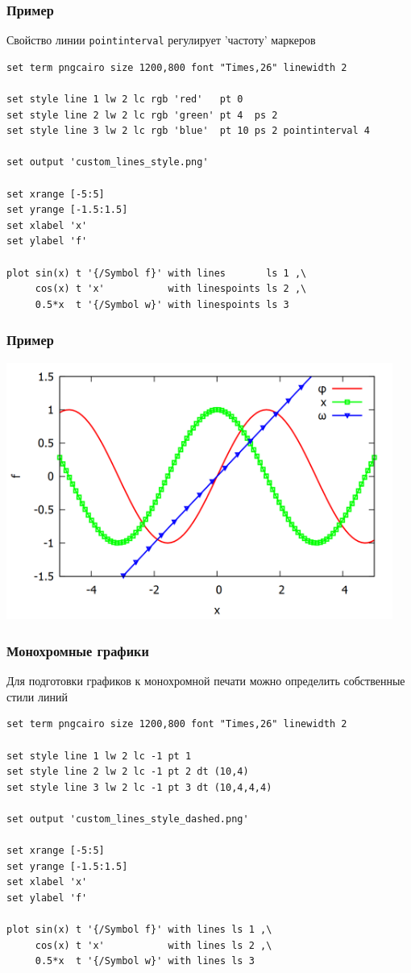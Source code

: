 \documentclass[12pt, compress]{beamer}
\newcommand{\code}[1]{\textcolor{dark-green}{\texttt{#1}}}
\begin{document}
\begin{frame}[t,fragile]
\frametitle{Пример}
Свойство линии \code{pointinterval} регулирует 'частоту' маркеров
\begin{lstlisting}[basicstyle={\scriptsize}]
set term pngcairo size 1200,800 font "Times,26" linewidth 2

set style line 1 lw 2 lc rgb 'red'   pt 0 
set style line 2 lw 2 lc rgb 'green' pt 4  ps 2
set style line 3 lw 2 lc rgb 'blue'  pt 10 ps 2 pointinterval 4    

set output 'custom_lines_style.png'

set xrange [-5:5]
set yrange [-1.5:1.5]
set xlabel 'x'
set ylabel 'f'

plot sin(x) t '{/Symbol f}' with lines       ls 1 ,\
     cos(x) t 'x'           with linespoints ls 2 ,\
     0.5*x  t '{/Symbol w}' with linespoints ls 3
\end{lstlisting}  
\end{frame}

\begin{frame}[t,fragile]
\frametitle{Пример}
\includegraphics[width=0.95\textwidth]{./gp/custom_lines_style.png}
\end{frame}


\begin{frame}[t,fragile]
\frametitle{Монохромные графики}
Для подготовки графиков к монохромной печати можно определить собственные стили линий 
\begin{lstlisting}[basicstyle={\scriptsize}]
set term pngcairo size 1200,800 font "Times,26" linewidth 2

set style line 1 lw 2 lc -1 pt 1 
set style line 2 lw 2 lc -1 pt 2 dt (10,4)
set style line 3 lw 2 lc -1 pt 3 dt (10,4,4,4)

set output 'custom_lines_style_dashed.png'

set xrange [-5:5]
set yrange [-1.5:1.5]
set xlabel 'x'
set ylabel 'f'

plot sin(x) t '{/Symbol f}' with lines ls 1 ,\
     cos(x) t 'x'           with lines ls 2 ,\
     0.5*x  t '{/Symbol w}' with lines ls 3

\end{lstlisting}
\end{frame}
\end{document}
